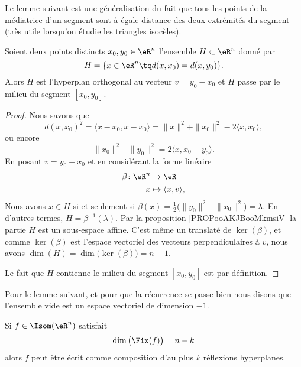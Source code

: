 Le lemme suivant est une généralisation du fait que tous les points de la médiatrice d'un segment sont à égale distance des deux extrémités du segment (très utile lorsqu'on étudie les triangles isocèles).
\begin{lemma}        \label{LEMooDPLYooJKZxiM}
    Soient deux points distincts \( x_0,y_0\in \eR^n\) l'ensemble \( H\subset \eR^n\) donné par
    \begin{equation}
        H=\{ x\in \eR^n\tq d(x,x_0)=d(x,y_0) \}.
    \end{equation}
    Alors \( H\) est l'hyperplan orthogonal au vecteur \( v=y_0-x_0\) et \( H\) passe par le milieu du segment \( [x_0,y_0] \).
\end{lemma}

\begin{proof}
    Nous savons que
    \begin{equation}
        d(x,x_0)^2=\langle x-x_0, x-x_0\rangle =\| x \|^2+\| x_0 \|^2-2\langle x, x_0\rangle,
    \end{equation}
    ou encore
    \begin{equation}
        \| x_0 \|^2-\| y_0 \|^2=2\langle x, x_0-y_0\rangle .
    \end{equation}
    En posant \( v=y_0-x_0\) et en considérant la forme linéaire
    \begin{equation}
        \begin{aligned}
            \beta\colon \eR^n&\to \eR \\
            x&\mapsto \langle x, v\rangle , 
        \end{aligned}
    \end{equation}
    Nous avons \( x\in H\) si et seulement si \( \beta(x)=\frac{ 1 }{2}\big( \| y_0 \|^2-\| x_0 \|^2 \big)=\lambda\). En d'autres termes, \( H=\beta^{-1}(\lambda)\). Par la proposition \ref{PROPooAKJBooMkmsiV} la partie \( H\) est un sous-espace affine. C'est même un translaté de \( \ker(\beta)\), et comme \( \ker(\beta)\) est l'espace vectoriel des vecteurs perpendiculaires à \( v\), nous avons \( \dim(H)=\dim\big( \ker(\beta) \big)=n-1\).

    Le fait que \( H\) contienne le milieu du segment \( [x_0,y_0]\) est par définition.
\end{proof}

Pour le lemme suivant, et pour que la récurrence se passe bien nous disons que l'ensemble vide est un espace vectoriel de dimension \( -1\).
\begin{lemma}       \label{LEMooJCDRooGAmlwp}
    Si \( f\in\Isom(\eR^n)\) satisfait 
    \begin{equation}
        \dim\big( \Fix(f) \big)=n-k
    \end{equation}
    alors \( f\) peut être écrit comme composition d'au plus \( k\) réflexions hyperplanes.
\end{lemma}

